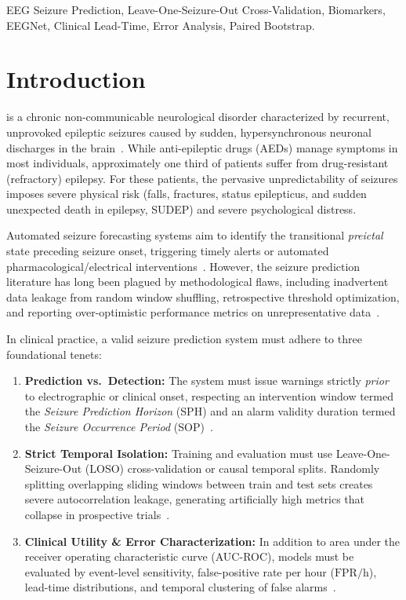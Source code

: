 \documentclass[10pt,journal,compsoc]{IEEEtran}
\begin{document}
{\begin{IEEEkeywords}
EEG Seizure Prediction, Leave-One-Seizure-Out Cross-Validation, Biomarkers, EEGNet, Clinical Lead-Time, Error Analysis, Paired Bootstrap.
\end{IEEEkeywords}}

\maketitle
\IEEEdisplaynontitleabstractindextext
\IEEEpeerreviewmaketitle

\section{Introduction}
 is a chronic non-communicable neurological disorder characterized by recurrent, unprovoked epileptic seizures caused by sudden, hypersynchronous neuronal discharges in the brain~\cite{kuhlmann2018seizure}. While anti-epileptic drugs (AEDs) manage symptoms in most individuals, approximately one third of patients suffer from drug-resistant (refractory) epilepsy. For these patients, the pervasive unpredictability of seizures imposes severe physical risk (falls, fractures, status epilepticus, and sudden unexpected death in epilepsy, SUDEP) and severe psychological distress. 

Automated seizure forecasting systems aim to identify the transitional \emph{preictal} state preceding seizure onset, triggering timely alerts or automated pharmacological/electrical interventions~\cite{mormann2007seizure}. However, the seizure prediction literature has long been plagued by methodological flaws, including inadvertent data leakage from random window shuffling, retrospective threshold optimization, and reporting over-optimistic performance metrics on unrepresentative data~\cite{kuhlmann2018seizure,ren2022preictal}.

In clinical practice, a valid seizure prediction system must adhere to three foundational tenets:
\begin{enumerate}
    \item \textbf{Prediction vs.\ Detection:} The system must issue warnings strictly \emph{prior} to electrographic or clinical onset, respecting an intervention window termed the \emph{Seizure Prediction Horizon} (SPH) and an alarm validity duration termed the \emph{Seizure Occurrence Period} (SOP)~\cite{ren2022preictal}.
    \item \textbf{Strict Temporal Isolation:} Training and evaluation must use Leave-One-Seizure-Out (LOSO) cross-validation or causal temporal splits. Randomly splitting overlapping sliding windows between train and test sets creates severe autocorrelation leakage, generating artificially high metrics that collapse in prospective trials~\cite{ibrahim2023patient}.
    \item \textbf{Clinical Utility & Error Characterization:} In addition to area under the receiver operating characteristic curve (AUC-ROC), models must be evaluated by event-level sensitivity, false-positive rate per hour ($\text{FPR/h}$), lead-time distributions, and temporal clustering of false alarms~\cite{ibrahim2023patient}.
\end{enumerate}
\end{document}
